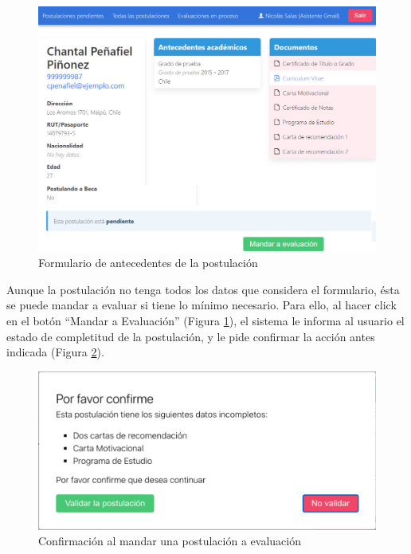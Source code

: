 \begin{figure}[!ht]
    \begin{center}
        \includegraphics[scale=0.23]{imagenes/04-antecedentes-postulacion.png}
    \end{center}
    \caption{Formulario de antecedentes de la postulación}
    \label{fig:formulario-antecedentes}
\end{figure}

Aunque la postulación no tenga todos los datos que considera el formulario, ésta
se puede mandar a evaluar si tiene lo mínimo necesario. Para ello, al hacer
click en el botón “Mandar a Evaluación” (Figura
\ref{fig:formulario-antecedentes}), el sistema le informa al usuario el estado
de completitud de la postulación, y le pide confirmar la acción antes indicada
(Figura \ref{fig:confirmacion-evaluacion}).

\begin{figure}[!ht]
    \begin{center}
        \includegraphics[scale=0.23]{imagenes/04-confirmacion-evaluacion.png}
    \end{center}
    \caption{Confirmación al mandar una postulación a evaluación}
    \label{fig:confirmacion-evaluacion}
\end{figure}

